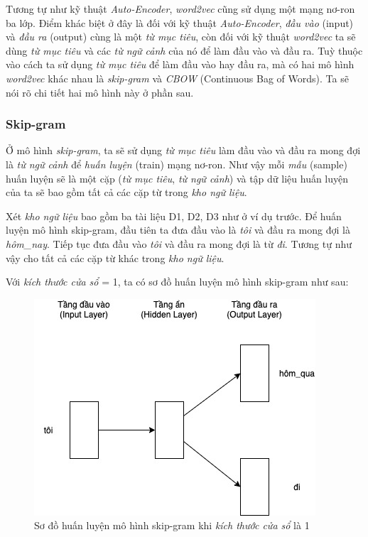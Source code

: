 Tương tự như kỹ thuật \textit{Auto-Encoder}, \textit{word2vec} cũng sử dụng một mạng nơ-ron ba lớp. Điểm khác biệt ở đây là đối với kỹ thuật \textit{Auto-Encoder}, \textit{đầu vào} (input) và \textit{đầu ra} (output) cùng là một \textit{từ mục tiêu}, còn đối với kỹ thuật \textit{word2vec} ta sẽ dùng \textit{từ mục tiêu} và các \textit{từ ngữ cảnh} của nó để làm đầu vào và đầu ra. Tuỳ thuộc vào cách ta sử dụng \textit{từ mục tiêu} để làm đầu vào hay đầu ra, mà có hai mô hình \textit{word2vec} khác nhau là \textit{skip-gram} và \textit{CBOW} (Continuous Bag of Words). Ta sẽ nói rõ chi tiết hai mô hình này ở phần sau.

\subsubsection{Skip-gram}
Ở mô hình \textit{skip-gram}, ta sẽ sử dụng \textit{từ mục tiêu} làm đầu vào và đầu ra mong đợi là \textit{từ ngữ cảnh} để \textit{huấn luyện} (train) mạng nơ-ron. Như vậy mỗi \textit{mẫu} (sample) huấn luyện sẽ là một cặp (\textit{từ mục tiêu}, \textit{từ ngữ cảnh}) và tập dữ liệu huấn luyện của ta sẽ bao gồm tất cả các cặp từ trong \textit{kho ngữ liệu}.

Xét \textit{kho ngữ liệu} bao gồm ba tài liệu D1, D2, D3 như ở ví dụ trước. Để huấn luyện mô hình skip-gram, đầu tiên ta đưa đầu vào là \textit{tôi} và đầu ra mong đợi là \textit{hôm\_nay}. Tiếp tục đưa đầu vào \textit{tôi} và đầu ra mong đợi là từ \textit{đi}.  Tương tự như vậy cho tất cả các cặp từ khác trong \textit{kho ngữ liệu}.

Với \textit{kích thước cửa sổ} = 1, ta có sơ đồ huấn luyện mô hình skip-gram như sau:

\begin{figure}[!h]
	\centering
		\includegraphics[width=0.5\columnwidth]{books/artificial-neural-network/chapter04/figure/skip-gram-window-size-1.jpg}
        \caption{Sơ đồ huấn luyện mô hình skip-gram khi \textit{kích thước cửa sổ} là 1}
        \label{fig:skip_gram_window_size_1}
\end{figure}

